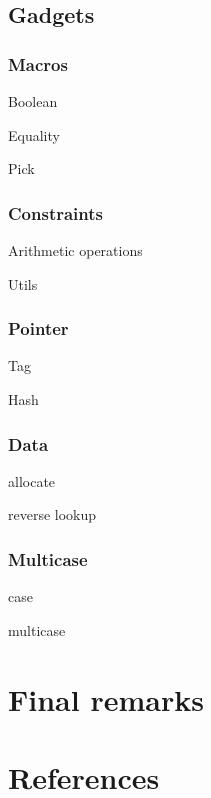 \documentclass[10pt, english]{article}
\begin{document}
\subsection{Gadgets}

\subsubsection{Macros}

Boolean

Equality

Pick

\subsubsection{Constraints}

Arithmetic operations

Utils

\subsubsection{Pointer}

Tag

Hash

\subsubsection{Data}

allocate

reverse lookup

\subsubsection{Multicase}

case

multicase



\section{Final remarks}

\section{References}




\end{document}
